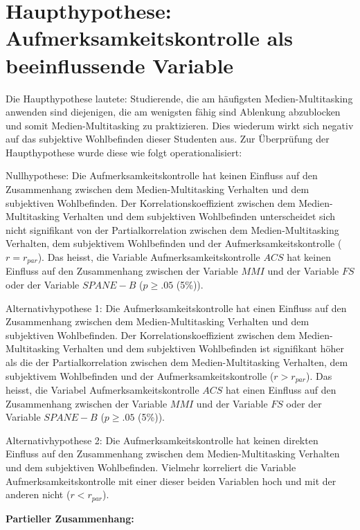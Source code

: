 \section{Haupthypothese: Aufmerksamkeitskontrolle als beeinflussende Variable}\label{label.ergebnisse.haupthypothese}
Die Haupthypothese lautete: Studierende, die am häufigsten Medien-Multitasking anwenden sind diejenigen, die am wenigsten fähig sind Ablenkung abzublocken und somit Medien-Multitasking zu praktizieren. Dies wiederum wirkt sich negativ auf das subjektive Wohlbefinden dieser Studenten aus. Zur Überprüfung der Haupthypothese wurde diese wie folgt operationalisiert:
\par
Nullhypothese: Die Aufmerksamkeitskontrolle hat keinen Einfluss auf den Zusammenhang zwischen dem Medien-Multitasking Verhalten und dem subjektiven Wohlbefinden. Der Korrelationskoeffizient zwischen dem Medien-Multitasking Verhalten und dem subjektiven Wohlbefinden unterscheidet sich nicht signifikant von der Partialkorrelation zwischen dem Medien-Multitasking Verhalten, dem subjektivem Wohlbefinden und der Aufmerksamkeitskontrolle ($r=r_{par}$). Das heisst, die Variable Aufmerksamkeitskontrolle $ACS$ hat keinen Einfluss auf den Zusammenhang zwischen der Variable $MMI$ und der Variable $FS$ oder der Variable $SPANE-B$ ($p \geq .05$ (5\%)). 
\par
Alternativhypothese 1: Die Aufmerksamkeitskontrolle hat einen Einfluss auf den Zusammenhang zwischen dem Medien-Multitasking Verhalten und dem subjektiven Wohlbefinden. Der Korrelationskoeffizient zwischen dem Medien-Multitasking Verhalten und dem subjektiven Wohlbefinden ist signifikant höher als die der Partialkorrelation zwischen dem Medien-Multitasking Verhalten, dem subjektivem Wohlbefinden und der Aufmerksamkeitskontrolle ($r>r_{par}$). Das heisst, die Variabel Aufmerksamkeitskontrolle $ACS$ hat einen Einfluss auf den Zusammenhang zwischen der Variable $MMI$ und der Variable $FS$ oder der Variable $SPANE-B$ ($p \geq .05$ (5\%)). 
\par
Alternativhypothese 2: Die Aufmerksamkeitskontrolle hat keinen direkten Einfluss auf den Zusammenhang zwischen dem Medien-Multitasking Verhalten und dem subjektiven Wohlbefinden. 
Vielmehr korreliert die Variable Aufmerksamkeitskontrolle mit einer dieser beiden Variablen hoch und mit der anderen nicht ($r<r_{par}$). 
\par
\textbf{Partieller Zusammenhang:}
